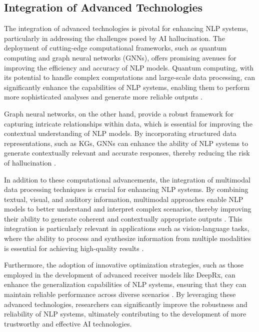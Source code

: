 \subsection{Integration of Advanced Technologies} \label{subsec:Integration of Advanced Technologies}

The integration of advanced technologies is pivotal for enhancing NLP systems, particularly in addressing the challenges posed by AI hallucination. The deployment of cutting-edge computational frameworks, such as quantum computing and graph neural networks (GNNs), offers promising avenues for improving the efficiency and accuracy of NLP models. Quantum computing, with its potential to handle complex computations and large-scale data processing, can significantly enhance the capabilities of NLP systems, enabling them to perform more sophisticated analyses and generate more reliable outputs \cite{liao2024graphneuralnetworksquantum}.



Graph neural networks, on the other hand, provide a robust framework for capturing intricate relationships within data, which is essential for improving the contextual understanding of NLP models. By incorporating structured data representations, such as KGs, GNNs can enhance the ability of NLP systems to generate contextually relevant and accurate responses, thereby reducing the risk of hallucination \cite{chaudhuri2021groundingdialoguesystemsknowledge}.



In addition to these computational advancements, the integration of multimodal data processing techniques is crucial for enhancing NLP systems. By combining textual, visual, and auditory information, multimodal approaches enable NLP models to better understand and interpret complex scenarios, thereby improving their ability to generate coherent and contextually appropriate outputs \cite{ramesh2021zero}. This integration is particularly relevant in applications such as vision-language tasks, where the ability to process and synthesize information from multiple modalities is essential for achieving high-quality results \cite{li2023blip}.



Furthermore, the adoption of innovative optimization strategies, such as those employed in the development of advanced receiver models like DeepRx, can enhance the generalization capabilities of NLP systems, ensuring that they can maintain reliable performance across diverse scenarios \cite{luostari2024adaptingrealityovertheairvalidation}. By leveraging these advanced technologies, researchers can significantly improve the robustness and reliability of NLP systems, ultimately contributing to the development of more trustworthy and effective AI technologies.












